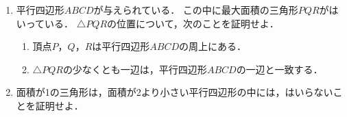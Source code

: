 \documentclass[../../main.tex]{subfiles}
\begin{document}
\begin{enumerate}
  \item 平行四辺形$ABCD$が与えられている．
    この中に最大面積の三角形$PQR$がはいっている．
    $\triangle PQR$の位置について，次のことを証明せよ．
    \begin{enumerate}
      \item 頂点$P$，$Q$，$R$は平行四辺形$ABCD$の周上にある．
      \item $\triangle PQR$の少なくとも一辺は，平行四辺形$ABCD$の一辺と一致する．
    \end{enumerate}
  \item 面積が1の三角形は，面積が2より小さい平行四辺形の中には，はいらないことを証明せよ．
\end{enumerate}
\end{document}
